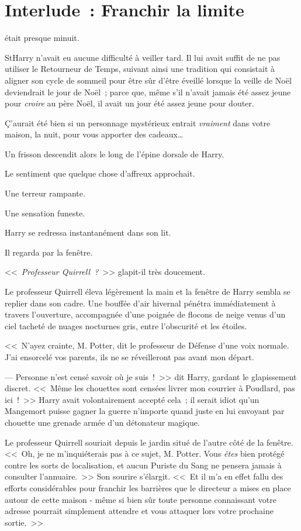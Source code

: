 \chapter{Interlude~: Franchir la limite}

 était presque minuit.

\hplettrineextrapara
StHarry n'avait eu aucune difficulté à veiller tard. Il lui avait suffit de ne pas utiliser le Retourneur de Temps, suivant ainsi une tradition qui consistait à aligner son cycle de sommeil pour être sûr d'être éveillé lorsque la veille de Noël deviendrait le jour de Noël~; parce que, même s'il n'avait jamais été assez jeune pour \emph{croire} au père Noël, il avait un jour été assez jeune pour douter.

Ç'aurait été bien si un personnage mystérieux entrait \emph{vraiment} dans votre maison, la nuit, pour vous apporter des cadeaux…

Un frisson descendit alors le long de l'épine dorsale de Harry.

Le sentiment que quelque chose d'affreux approchait.

Une terreur rampante.

Une sensation funeste.

Harry se redressa instantanément dans son lit.

Il regarda par la fenêtre.

<<~\emph{Professeur Quirrell~?}~>> glapit-il très doucement.

Le professeur Quirrell éleva légèrement la main et la fenêtre de Harry sembla se replier dans son cadre. Une bouffée d'air hivernal pénétra immédiatement à travers l'ouverture, accompagnée d'une poignée de flocons de neige venus d'un ciel tacheté de nuages nocturnes gris, entre l'obscurité et les étoiles.

<<~N'ayez crainte, M. Potter, dit le professeur de Défense d'une voix normale. J'ai ensorcelé vos parents, ils ne se réveilleront pas avant mon départ.

--- Personne n'est censé savoir où je suis~!~>> dit Harry, gardant le glapissement discret. <<~Même les chouettes sont censées livrer mon courrier à Poudlard, pas ici~!~>> Harry avait volontairement accepté cela~; il serait idiot qu'un Mangemort puisse gagner la guerre n'importe quand juste en lui envoyant par chouette une grenade armée d'un détonateur magique.

Le professeur Quirrell souriait depuis le jardin situé de l'autre côté de la fenêtre. <<~Oh, je ne m'inquiéterais pas à ce sujet, M. Potter. Vous \emph{êtes} bien protégé contre les sorts de localisation, et aucun Puriste du Sang ne pensera jamais à consulter l'annuaire.~>> Son sourire s'élargit. <<~Et il m'a en effet fallu des efforts considérables pour franchir les barrières que le directeur a mises en place autour de cette maison - même si bien sûr toute personne connaissant votre adresse pourrait simplement attendre et vous attaquer lors votre prochaine sortie.~>>

